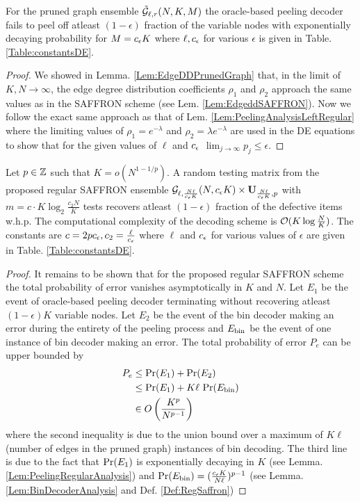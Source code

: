 \begin{lemma}
\label{Lem:PeelingRegularAnalysis}
For the pruned graph ensemble $\tilde{\mathcal{G}}_{\ell,r}(N, K,M)$ the oracle-based peeling decoder fails to peel off atleast $(1-\epsilon)$ fraction of the variable nodes with exponentially decaying probability for $M=c_{\epsilon} K$ where $\ell, c_{\epsilon}$ for various $\epsilon$ is given in Table. \ref{Table:constantsDE}.
\end{lemma}
\begin{proof}
We showed in Lemma. \ref{Lem:EdgeDDPrunedGraph} that, in the limit of $K,N\rightarrow\infty$, the edge degree distribution coefficients $\rho_1$ and $\rho_2$ approach the same values as in the SAFFRON scheme (see Lem. \ref{Lem:EdgeddSAFFRON}). Now we follow the exact same approach as that of Lem. \ref{Lem:PeelingAnalysisLeftRegular} where the limiting values of $\rho_1=e^{-\lambda}$ and $\rho_2=\lambda e^{-\lambda}$ are used in the DE equations to show that for the given values of $\ell$ and $c_{\epsilon}$ $\lim_{j\rightarrow\infty}p_j \leq \epsilon$. 
\end{proof}

\begin{theorem}
\label{Thm:NoiselessMain}
Let $p\in\mathbb{Z}$ such that $K=o(N^{1-1/p})$. A random testing matrix from the proposed regular SAFFRON ensemble $\mathcal{G}_{\ell,\frac{N\ell}{c_{\epsilon} K}}(N,c_{\epsilon} K)\times \mathbf{U}_{\frac{N\ell}{c_{\epsilon} K},p}$ with $m=c\cdot K\log_{2}\frac{c_2 N}{K}$ tests recovers atleast $(1-\epsilon)$ fraction of the defective items w.h.p. The computational complexity of the decoding scheme is $\mathcal{O}(K\log \frac{N}{K})$. The constants are $c=2pc_{\epsilon}, c_2=\frac{\ell}{c_{\epsilon}}$ where $\ell$ and $c_{\epsilon}$ for various values of $\epsilon$ are given in Table. \ref{Table:constantsDE}.
\end{theorem}
\begin{proof}
It remains to be shown that for the proposed regular SAFFRON scheme the total probability of error vanishes asymptotically in $K$ and $N$. Let $E_1$ be the event of oracle-based peeling decoder terminating without recovering atleast $(1-\epsilon)K$ variable nodes. Let $E_2$ be the event of the bin decoder making an error during the entirety of the peeling process and $E_{\text{bin}}$ be the event of one instance of bin decoder making an error. The total probability of error $P_e$ can be upper bounded by
\begin{align*}
P_e &\leq \text{Pr}(E_1)+ \text{Pr}(E_2)\\
               &\leq \text{Pr}(E_1)+ K\ell\text{ Pr}(E_{\text{bin}})\\
               &\in O\left(\frac{K^{p}}{N^{p-1}}\right)
\end{align*}
where the second inequality is due to the union bound over a maximum of $K\ell$ (number of edges in the pruned graph) instances of bin decoding. The third line is due to the fact that $\text{Pr}(E_1)$ is exponentially decaying in $K$ (see Lemma. \ref{Lem:PeelingRegularAnalysis}) and $\text{Pr}(E_{\text{bin}})=(\frac{c_{\epsilon} K}{N\ell})^{p-1}$ (see Lemma. \ref{Lem:BinDecoderAnalysis} and Def. \ref{Def:RegSaffron})
\end{proof}

